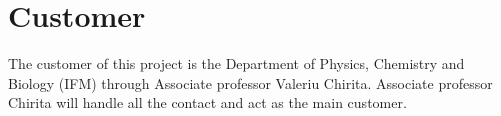 \section{Customer}
The customer of this project is the Department of Physics, Chemistry and Biology (IFM) through Associate professor Valeriu Chirita. Associate professor Chirita will handle all the contact and act as the main customer.
